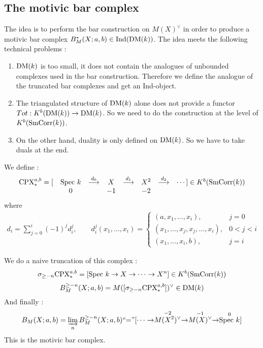 \subsection{The motivic bar complex}

The idea is to perform the bar construction on $M(X)^{\vee}$ in order to produce a motivic bar complex $B_M^*(X;a,b) \in \mathrm{Ind}(\mathrm{DM}(k))$. The idea meets the following technical problems :

\begin{enumerate}
\item $\mathrm{DM}(k)$ is too small, it does not contain the analogues of unbounded complexes used in the bar construction. Therefore we define the analogue of the truncated bar complexes and get an Ind-object.
\item The triangulated structure of $\mathrm{DM}(k)$ alone does not provide a functor $Tot : K^b(\mathrm{DM}(k)) \to \mathrm{DM}(k)$. So we need to do the construction at the level of $K^b(\mathrm{SmCorr}(k))$.
\item On the other hand, duality is only defined on $\mathrm{DM}(k)$. So we have to take duals at the end.
\end{enumerate}

We define :
\[
\begin{array}{rccccccl}
\mathrm{CPX}^{a,b}_* = [ & \mathrm{Spec}~ k & \stackrel{d_0}{\longrightarrow} & X & \stackrel{d_1}{\longrightarrow} & X^2 & \stackrel{d_2}{\longrightarrow} & \cdots ] \in K^b(\mathrm{SmCorr}(k)) \\
& 0 &  & -1 & & -2 & &
\end{array}
\]
where
\begin{eqnarray*}
d_i = \sum_{j=0}^{i} (-1)^j d_i^j, \qquad d_i^j(x_1, \ldots, x_i) = \left\{ \begin{array}{ll}
(a,x_1, \ldots, x_i), & j=0 \\
(x_1, \ldots, x_j, x_j, \ldots, x_i), & 0 < j < i \\
(x_1, \ldots, x_i, b), & j=i
\end{array} \right.
\end{eqnarray*}

We do a naive truncation of this complex :
\[
\sigma_{\geq -n} \mathrm{CPX}_*^{a,b} = [ \mathrm{Spec}~ k \to X \to \cdots \to X^n] \in K^b(\mathrm{SmCorr}(k))
\]
\[
B_M^{\geq -n}(X;a,b) = M([\sigma_{\geq -n} \mathrm{CPX}_*^{a,b}])^{\vee} \in \mathrm{DM}(k)
\]
And finally :
\[
B_M(X;a,b) = \varinjlim_n B^{\geq -n}_M(X;a,b) \textrm{``$=$''}[ \cdots \to \stackrel{-2}{M(X^2)^{\vee}} \to \stackrel{-1}{M(X)^{\vee}} \to \stackrel{0}{\mathrm{Spec}~ k}]
\]
This is the motivic bar complex.

